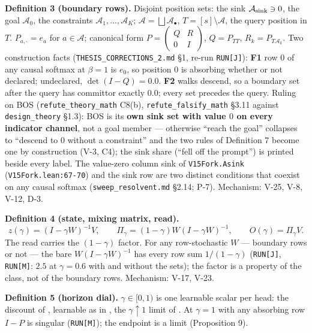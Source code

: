 \documentclass[11pt,a4paper]{article}
\theoremstyle{plain}
\theoremstyle{definition}
\theoremstyle{remark}
\begin{document}
\textbf{Definition 3 (boundary rows).} Disjoint position sets: the sink
\(\mathcal A_{\rm sink}\ni0\), the goal \(\mathcal A_0\), the
constraints \(\mathcal A_1,\dots,\mathcal A_K\);
\(\mathcal A=\bigsqcup\mathcal A_\bullet\),
\(T=[s]\setminus\mathcal A\), the query position in \(T\).
\(P_{a,\cdot}=e_a\) for \(a\in\mathcal A\); canonical form
\(P=\begin{pmatrix}Q&R\\0&I\end{pmatrix}\), \(Q=P_{TT}\),
\(R_k=P_{T\mathcal A_k}\). Two construction facts
(\texttt{THESIS\_CORRECTIONS\_2.md} §1, re-run \texttt{RUN{[}J{]}}):
\textbf{F1} row 0 of any causal softmax at \(\beta=1\) is \(e_0\), so
position 0 is absorbing whether or not declared; undeclared,
\(\det(I-Q)=0.0\). \textbf{F2} walks descend, so a boundary set after
the query has committor exactly \(0.0\); every set precedes the query.
Ruling on BOS (\texttt{refute\_theory\_math} C8(b),
\texttt{refute\_falsify\_math} §3.11 against \texttt{design\_theory}
§1.3): BOS is its \textbf{own sink set with value \(0\) on every
indicator channel}, not a goal member --- otherwise ``reach the goal''
collapses to ``descend to 0 without a constraint'' and the two rules of
Definition 7 become one by construction (V-3, C4); the sink share
(``fell off the prompt'') is printed beside every label. The value-zero
column sink of \texttt{V15Fork.Asink} (\texttt{V15Fork.lean:67-70}) and
the sink row are two distinct conditions that coexist on any causal
softmax (\texttt{sweep\_resolvent.md} §2.14; P-7). Mechanism: V-25, V-8,
V-12, D-3.

\textbf{Definition 4 (state, mixing matrix, read).}
\[z(\gamma)=(I-\gamma W)^{-1}V,\qquad \Pi_\gamma=(1-\gamma)W(I-\gamma W)^{-1},\qquad O(\gamma)=\Pi_\gamma V.\]
The read carries the \((1-\gamma)\) factor. For any row-stochastic \(W\)
--- boundary rows or not --- the bare \(W(I-\gamma W)^{-1}\) has every
row sum \(1/(1-\gamma)\) (\texttt{RUN{[}J{]}}, \texttt{RUN{[}M{]}}:
\(2.5\) at \(\gamma=0.6\) with and without the sets); the factor is a
property of the class, not of the boundary rows. Mechanism: V-17, V-23.

\textbf{Definition 5 (horizon dial).} \(\gamma\in[0,1)\) is one
learnable scalar per head: the discount of
\citep{bellman-1957-markovian}, learnable as in
\citep{roffo-2026-infsa}, the \(\gamma\uparrow1\) limit of
\citep{kemeny-1960-finitemarkov}. At \(\gamma=1\) with any absorbing row
\(I-P\) is singular (\texttt{RUN{[}M{]}}); the endpoint is a limit
(Proposition 9).
\end{document}
